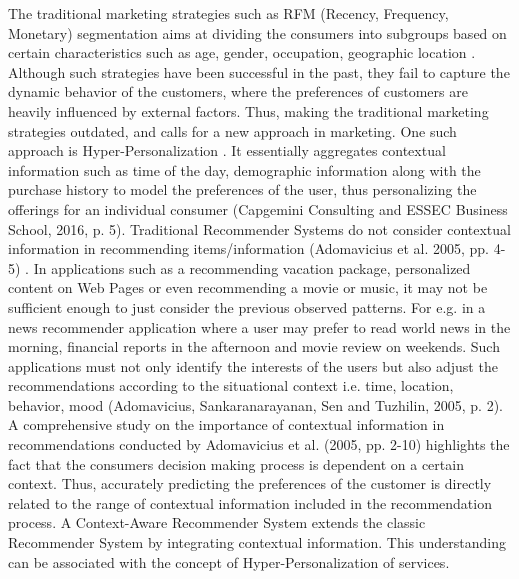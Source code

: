 The traditional marketing strategies such as RFM (Recency, Frequency, Monetary) segmentation aims at dividing the consumers into subgroups based on certain characteristics such as age, gender, occupation, geographic location \autocite[]{CapgeminiconsultingESSECBusinessSchool2016}. Although such strategies have been successful in the past, they fail to capture the dynamic behavior of the customers, where the preferences of customers are heavily influenced by external factors. Thus, making the traditional marketing strategies outdated, and calls for a new approach in marketing. One such approach is Hyper-Personalization \autocite[2]{Sodhi}. It essentially aggregates contextual information such as time of the day, demographic information along with the purchase history to model the preferences of the user, thus personalizing the offerings for an individual consumer (Capgemini Consulting and ESSEC Business School, 2016, p. 5). Traditional Recommender Systems do not consider contextual information in recommending items/information \autocite[4-5]{Adomavicius2005} (Adomavicius et al. 2005, pp. 4-5) . In applications such as a recommending vacation package, personalized content on Web Pages or even recommending a movie or music, it may not be sufficient enough to just consider the previous observed patterns. For e.g. in a news recommender application where a user may prefer to read world news in the morning, financial reports in the afternoon and movie review on weekends. Such applications must not only identify the interests of the users but also adjust the recommendations according to the situational context i.e. time, location, behavior, mood \autocite[2]{Adomavicius2005} (Adomavicius, Sankaranarayanan, Sen and Tuzhilin, 2005, p. 2). A comprehensive study on the importance of contextual information in recommendations conducted by Adomavicius et al. (2005, pp. 2-10) highlights the fact that the consumers decision making process is dependent on a certain context. Thus, accurately predicting the preferences of the customer is directly related to the range of contextual information included in the recommendation process. A Context-Aware Recommender System extends the classic Recommender System by integrating contextual information. This understanding can be associated with the concept of Hyper-Personalization of services. \\ \par
\noindent
